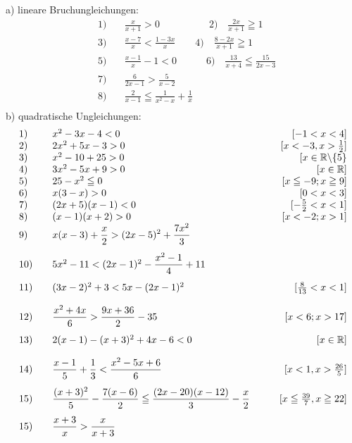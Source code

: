 \documentclass[a4paper, twoside, parskip, 10pt, smallheadings]{scrbook}
\theoremstyle{plain}
\theoremstyle{definition}
\newcommand{\D}{\displaystyle}
\renewcommand{\leq}{\leqq}
\renewcommand{\geq}{\geqq}
\begin{document}
a) lineare Bruchungleichungen: \begin{eqnarray} &1)& \quad \frac{x}{x+1}>0 \qquad \qquad
\quad2)\quad
    \frac{2x}{x+1}\geq 1 \\
&3)& \quad \frac{x-7}{x}<\frac{1-3x}{x} \qquad 4) \quad
    \frac{8-2x}{x+1}\geq1\\
&5)& \quad \frac{x-1}{x}-1<0 \qquad \quad 6)\quad
    \frac{13}{x+4}\leq\frac{15}{2x-3}\\
&7)& \quad \frac{6}{2x-1}>\frac{5}{x-2}\\
&8)& \quad \frac{2}{x-1}\leq\frac{1}{x^2-x}+\frac{1}{x}\\
\end{eqnarray}b) quadratische Ungleichungen: \begin{eqnarray}
\begin{array}{llc@{\qquad}r}
1)& \quad x^2-3x-4 <0   &&[-1<x<4]\\
2)& \quad 2x^2+5x-3 >0  &&[x<-3,x>\frac{1}{2}]\\
3)& \quad x^2-10+25>0   &&[x\in \mathbb{R}\backslash\{5\}\\
4)& \quad 3x^2-5x+9>0   &&[x\in \mathbb{R}]\\
5)& \quad 25-x^2\leq0   &&[x\leq-9; x\geq9]\\
6)& \quad x(3-x)>0  &&[0<x<3]\\
7)& \quad (2x+5)(x-1)<0 &&[-\frac{5}{2}<x<1]\\
8)& \quad (x-1)(x+2)>0  &&[x<-2;x>1]\\
9)& \quad x(x-3)+\D{\frac{x}{2}}>(2x-5)^2+\D{\frac{7x^2}{3}}    &&\\[0.4cm]
10)& \quad 5x^2-11<(2x-1)^2-\D{\frac{x^2-1}{4}}+11      &&\\[0.4cm]
11)& \quad (3x-2)^2+3<5x-(2x-1)^2   &&[\frac{8}{13}<x<1]\\[0.4cm]
12)& \quad \D{\frac{x^2+4x}{6}}>\D{\frac{9x+36}{2}}-35 &&[x<6;x>17]\\[0.4cm]
13)& \quad 2(x-1)-(x+3)^2+4x-6<0    &&[x\in \mathbb{R}]\\[0.4cm]
14)& \quad \D{\frac{x-1}{5}+\frac{1}{3}}<\D{\frac{x^2-5x+6}{6}}
            &&[x<1,x>\frac{26}{5}]\\[0.4cm]
15)& \quad \D{\frac{(x+3)^2}{5}-\frac{7(x-6)}{2}}\leq\D{\frac{(2x-20)
    (x-12)}{3}}-\frac{x}{2}     &&[x\leq\frac{39}{7},x\geq22]\\[0.4cm]
15)& \quad \D{\frac{x+3}{x}}>\D{\frac{x}{x+3}}
\end{array}
\end{eqnarray}
\end{document}
